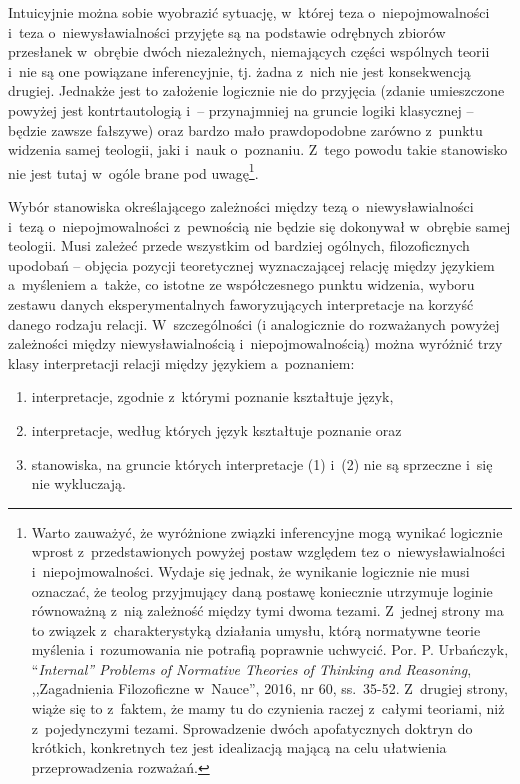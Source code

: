 \begin{enumerate}[label = \arabic*), itemindent=6mm, labelwidth=4mm, labelsep=2mm, itemsep=1em, leftmargin=0mm]
Intuicyjnie można sobie wyobrazić sytuację, w~której teza o~niepojmowalności i~teza o~niewysławialności przyjęte są na podstawie odrębnych zbiorów przesłanek w~obrębie dwóch niezależnych, niemających części wspólnych teorii i~nie są one powiązane inferencyjnie, tj. żadna z~nich nie jest konsekwencją drugiej. Jednakże jest to założenie logicznie nie do przyjęcia (zdanie umieszczone powyżej jest kontrtautologią i~-- przynajmniej na gruncie logiki klasycznej -- będzie zawsze fałszywe) oraz bardzo mało prawdopodobne zarówno z~punktu widzenia samej teologii, jaki i~nauk o~poznaniu. Z~tego powodu takie stanowisko nie jest tutaj w~ogóle brane pod uwagę\footnote{Warto zauważyć, że wyróżnione związki inferencyjne mogą wynikać logicznie wprost z~przedstawionych powyżej postaw względem tez o~niewysławialności i~niepojmowalności. Wydaje się jednak, że wynikanie logicznie nie musi oznaczać, że teolog przyjmujący daną postawę koniecznie utrzymuje loginie równoważną z~nią zależność między tymi dwoma tezami. Z~jednej strony ma to związek z~charakterystyką działania umysłu, którą normatywne teorie myślenia i~rozumowania nie potrafią poprawnie uchwycić. Por. P. Urbańczyk, ``\textit{Internal'' Problems of Normative Theories of Thinking and Reasoning}, ,,Zagadnienia Filozoficzne w~Nauce'', 2016, nr 60, ss.~35-52. Z~drugiej strony, wiąże się to z~faktem, że mamy tu do czynienia raczej z~całymi teoriami, niż z~pojedynczymi tezami. Sprowadzenie dwóch apofatycznych doktryn do krótkich, konkretnych tez jest idealizacją mającą na celu ułatwienia przeprowadzenia rozważań.}.
\end{enumerate}

Wybór stanowiska określającego zależności między tezą o~niewysławialności i~tezą o~niepojmowalności z~pewnością nie będzie się dokonywał w~obrębie samej teologii. Musi zależeć przede wszystkim od bardziej ogólnych, filozoficznych upodobań -- objęcia pozycji teoretycznej wyznaczającej relację między językiem a~myśleniem a~także, co istotne ze współczesnego punktu widzenia, wyboru zestawu danych eksperymentalnych faworyzujących interpretacje na korzyść danego rodzaju relacji. W~szczególności (i analogicznie do rozważanych powyżej zależności między niewysławialnością i~niepojmowalnością) można wyróżnić trzy klasy interpretacji relacji między językiem a~poznaniem:

\begin{enumerate}[label = (\arabic*)]
\item  interpretacje, zgodnie z~którymi poznanie kształtuje język,

\item  interpretacje, według których język kształtuje poznanie oraz

\item  stanowiska, na gruncie których interpretacje (1) i~(2) nie są sprzeczne i~się nie wykluczają.
\end{enumerate}

